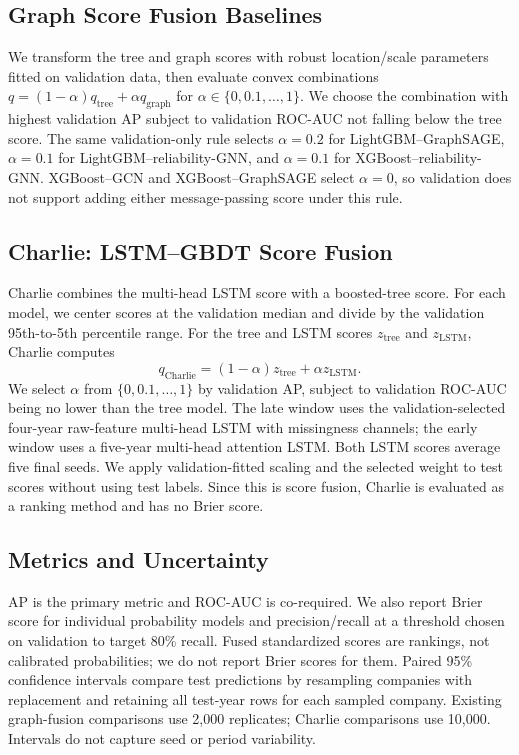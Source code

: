 \documentclass[conference]{IEEEtran}
\begin{document}
\subsection{Graph Score Fusion Baselines}
We transform the tree and graph scores with robust location/scale parameters fitted on validation data, then evaluate convex combinations $q=(1-\alpha)q_{\mathrm{tree}}+\alpha q_{\mathrm{graph}}$ for $\alpha\in\{0,0.1,\ldots,1\}$. We choose the combination with highest validation AP subject to validation ROC-AUC not falling below the tree score. The same validation-only rule selects $\alpha=0.2$ for LightGBM--GraphSAGE, $\alpha=0.1$ for LightGBM--reliability-GNN, and $\alpha=0.1$ for XGBoost--reliability-GNN. XGBoost--GCN and XGBoost--GraphSAGE select $\alpha=0$, so validation does not support adding either message-passing score under this rule.

\subsection{Charlie: LSTM--GBDT Score Fusion}
Charlie combines the multi-head LSTM score with a boosted-tree score. For each model, we center scores at the validation median and divide by the validation 95th-to-5th percentile range. For the tree and LSTM scores $z_{\mathrm{tree}}$ and $z_{\mathrm{LSTM}}$, Charlie computes
\begin{equation}
 q_{\mathrm{Charlie}}=(1-\alpha)z_{\mathrm{tree}}+\alpha z_{\mathrm{LSTM}}.
\end{equation}
We select $\alpha$ from $\{0,0.1,\ldots,1\}$ by validation AP, subject to validation ROC-AUC being no lower than the tree model. The late window uses the validation-selected four-year raw-feature multi-head LSTM with missingness channels; the early window uses a five-year multi-head attention LSTM. Both LSTM scores average five final seeds. We apply validation-fitted scaling and the selected weight to test scores without using test labels. Since this is score fusion, Charlie is evaluated as a ranking method and has no Brier score.

\subsection{Metrics and Uncertainty}
AP is the primary metric and ROC-AUC is co-required. We also report Brier score for individual probability models and precision/recall at a threshold chosen on validation to target 80\% recall. Fused standardized scores are rankings, not calibrated probabilities; we do not report Brier scores for them. Paired 95\% confidence intervals compare test predictions by resampling companies with replacement and retaining all test-year rows for each sampled company. Existing graph-fusion comparisons use 2,000 replicates; Charlie comparisons use 10,000. Intervals do not capture seed or period variability.
\end{document}
